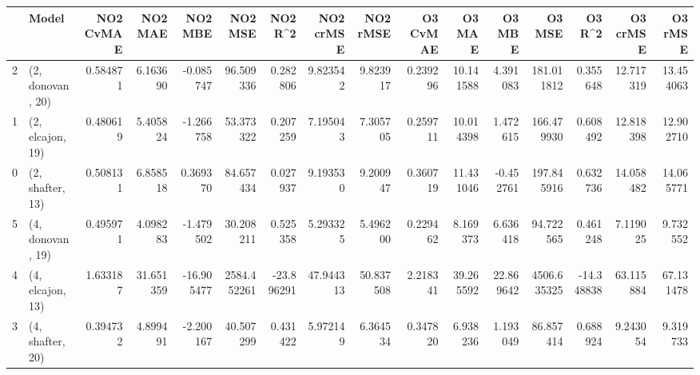 \begin{tabular}{llrrrrrrrrrrrrrr}
\toprule
{} &             Model &  NO2 CvMAE &    NO2 MAE &    NO2 MBE &      NO2 MSE &    NO2 R\textasciicircum2 &  NO2 crMSE &   NO2 rMSE &  O3 CvMAE &     O3 MAE &     O3 MBE &       O3 MSE &     O3 R\textasciicircum2 &   O3 crMSE &    O3 rMSE \\
\midrule
2 &  (2, donovan, 20) &   0.584871 &   6.163690 &  -0.085747 &    96.509336 &   0.282806 &   9.823542 &   9.823917 &  0.239296 &  10.141588 &   4.391083 &   181.011812 &   0.355648 &  12.717319 &  13.454063 \\
1 &  (2, elcajon, 19) &   0.480619 &   5.405824 &  -1.266758 &    53.373322 &   0.207259 &   7.195043 &   7.305705 &  0.259711 &  10.014398 &   1.472615 &   166.479930 &   0.608492 &  12.818398 &  12.902710 \\
0 &  (2, shafter, 13) &   0.508131 &   6.858518 &   0.369370 &    84.657434 &   0.027937 &   9.193530 &   9.200947 &  0.360719 &  11.431046 &  -0.452761 &   197.845916 &   0.632736 &  14.058482 &  14.065771 \\
5 &  (4, donovan, 19) &   0.495971 &   4.098283 &  -1.479502 &    30.208211 &   0.525358 &   5.293325 &   5.496200 &  0.229462 &   8.169373 &   6.636418 &    94.722565 &   0.461248 &   7.119025 &   9.732552 \\
4 &  (4, elcajon, 13) &   1.633187 &  31.651359 & -16.905477 &  2584.452261 & -23.896291 &  47.944313 &  50.837508 &  2.218341 &  39.265592 &  22.869642 &  4506.635325 & -14.348838 &  63.115884 &  67.131478 \\
3 &  (4, shafter, 20) &   0.394732 &   4.899491 &  -2.200167 &    40.507299 &   0.431422 &   5.972149 &   6.364534 &  0.347820 &   6.938236 &   1.193049 &    86.857414 &   0.688924 &   9.243054 &   9.319733 \\
\bottomrule
\end{tabular}

